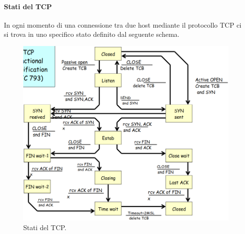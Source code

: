\paragraph{Stati del TCP}
In ogni momento di una connessione tra due host mediante il protocollo TCP ci si trova in uno specifico stato definito dal seguente schema.
\begin{figure}[h]
    \centering
    \includegraphics[scale=0.3]{Immagini/StatiTCP.png}
    \caption{Stati del TCP.}
\end{figure}

